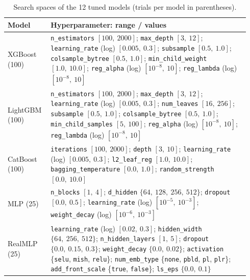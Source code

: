 \begin{table}[htbp]
\centering
\caption[Search spaces of the 12 tuned models]{Search spaces of the 12
tuned models (trials per model in parentheses).}
\label{tab:app-busca}
\footnotesize
\renewcommand{\arraystretch}{1.15}
\begin{tabular}{>{\raggedright\arraybackslash}p{0.16\linewidth}>{\raggedright\arraybackslash}p{0.78\linewidth}}
\toprule
Model & Hyperparameter: range / values \\
\midrule
XGBoost (100) &
\texttt{n\_estimators} $[100,\ 2000]$;
\texttt{max\_depth} $[3,\ 12]$;
\texttt{learning\_rate} (log) $[0.005,\ 0.3]$;
\texttt{subsample} $[0.5,\ 1.0]$;
\texttt{colsample\_\allowbreak bytree} $[0.5,\ 1.0]$;
\texttt{min\_\allowbreak child\_\allowbreak weight} $[1.0,\ 10.0]$;
\texttt{reg\_alpha} (log) $[10^{-8},\ 10]$;
\texttt{reg\_lambda} (log) $[10^{-8},\ 10]$ \\
\addlinespace[2pt]
LightGBM (100) &
\texttt{n\_estimators} $[100,\ 2000]$;
\texttt{max\_depth} $[3,\ 12]$;
\texttt{learning\_rate} (log) $[0.005,\ 0.3]$;
\texttt{num\_leaves} $[16,\ 256]$;
\texttt{subsample} $[0.5,\ 1.0]$;
\texttt{colsample\_\allowbreak bytree} $[0.5,\ 1.0]$;
\texttt{min\_\allowbreak child\_\allowbreak samples} $[5,\ 100]$;
\texttt{reg\_alpha} (log) $[10^{-8},\ 10]$;
\texttt{reg\_lambda} (log) $[10^{-8},\ 10]$ \\
\addlinespace[2pt]
CatBoost (100) &
\texttt{iterations} $[100,\ 2000]$;
\texttt{depth} $[3,\ 10]$;
\texttt{learning\_rate} (log) $[0.005,\ 0.3]$;
\texttt{l2\_leaf\_reg} $[1.0,\ 10.0]$;
\texttt{bagging\_\allowbreak temperature} $[0.0,\ 1.0]$;
\texttt{random\_\allowbreak strength} $[0.0,\ 10.0]$ \\
\addlinespace[2pt]
MLP (25) &
\texttt{n\_blocks} $[1,\ 4]$;
\texttt{d\_hidden} $\{64,\ 128,\ 256,\ 512\}$;
\texttt{dropout} $[0.0,\ 0.5]$;
\texttt{learning\_rate} (log) $[10^{-5},\ 10^{-3}]$;
\texttt{weight\_decay} (log) $[10^{-6},\ 10^{-3}]$ \\
\addlinespace[2pt]
RealMLP (25) &
\texttt{learning\_rate} (log) $[0.02,\ 0.3]$;
\texttt{hidden\_width} $\{64,\ 256,\ 512\}$;
\texttt{n\_\allowbreak hidden\_\allowbreak layers} $[1,\ 5]$;
\texttt{dropout} $\{0.0,\ 0.15,\ 0.3\}$;
\texttt{weight\_decay} $\{0.0,\ 0.02\}$;
\texttt{activation} \{\texttt{selu}, \texttt{mish}, \texttt{relu}\};
\texttt{num\_emb\_type} \{\texttt{none}, \texttt{pbld}, \texttt{pl},
\texttt{plr}\};
\texttt{add\_\allowbreak front\_\allowbreak scale} \{\texttt{true},
\texttt{false}\};
\texttt{ls\_eps} $\{0.0,\ 0.1\}$ \\

\end{tabular}
\end{table}
